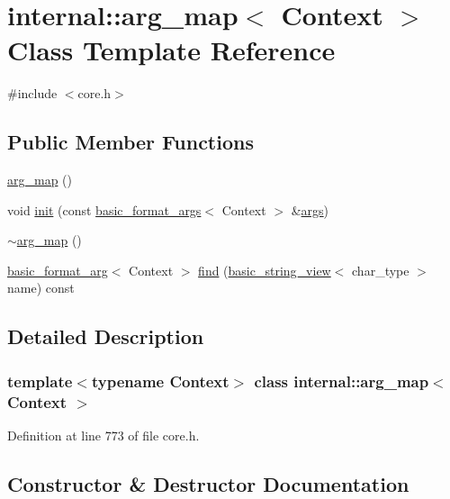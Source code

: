 \hypertarget{classinternal_1_1arg__map}{}\section{internal\+:\+:arg\+\_\+map$<$ Context $>$ Class Template Reference}
\label{classinternal_1_1arg__map}


{\ttfamily \#include $<$core.\+h$>$}

\subsection*{Public Member Functions}
\begin{DoxyCompactItemize}
\item 
\hyperlink{classinternal_1_1arg__map_a0ce0c70e50024f0125cc613323283cb2}{arg\+\_\+map} ()
\item 
void \hyperlink{classinternal_1_1arg__map_a8c9b335dab49cad2ea460e7294e19e41}{init} (const \hyperlink{classbasic__format__args}{basic\+\_\+format\+\_\+args}$<$ Context $>$ \&\hyperlink{printf_8h_a47047b7b28fd1342eef756b79c778580}{args})
\item 
\hyperlink{classinternal_1_1arg__map_a34802ac6b8c15dca0fb55d6663946693}{$\sim$arg\+\_\+map} ()
\item 
\hyperlink{classbasic__format__arg}{basic\+\_\+format\+\_\+arg}$<$ Context $>$ \hyperlink{classinternal_1_1arg__map_ae7e3b96f6d27cfac78a8df730eee4b8e}{find} (\hyperlink{classbasic__string__view}{basic\+\_\+string\+\_\+view}$<$ char\+\_\+type $>$ name) const
\end{DoxyCompactItemize}


\subsection{Detailed Description}
\subsubsection*{template$<$typename Context$>$\newline
class internal\+::arg\+\_\+map$<$ Context $>$}



Definition at line 773 of file core.\+h.



\subsection{Constructor \& Destructor Documentation}
\mbox{\label{classinternal_1_1arg__map_a0ce0c70e50024f0125cc613323283cb2}} 
